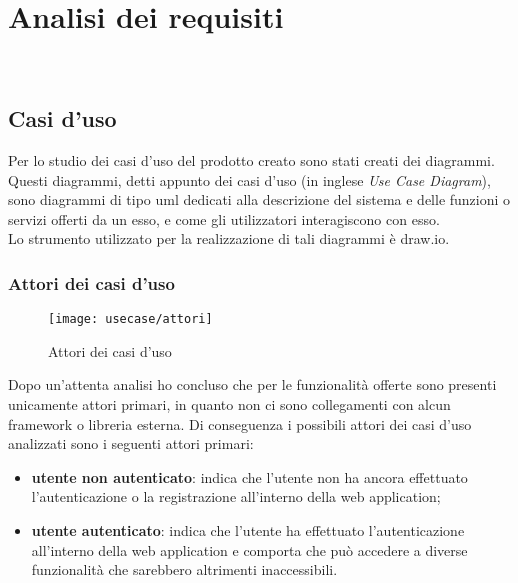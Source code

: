 
\chapter{Analisi dei requisiti}
\label{cap:analisi-requisiti}

\\

\section{Casi d'uso}
\label{sec:casi-uso}

Per lo studio dei casi d'uso del prodotto creato sono stati creati dei diagrammi.
Questi diagrammi, detti appunto dei casi d'uso (in inglese \emph{Use Case Diagram}), sono diagrammi di tipo \gls{uml} dedicati alla descrizione del sistema e delle funzioni o servizi offerti da un esso, e come gli utilizzatori interagiscono con esso.\\
Lo strumento utilizzato per la realizzazione di tali diagrammi è draw.io.

\subsection{Attori dei casi d'uso}
\label{subsec:attori}

\begin{figure}[H] 
	\centering 
	\texttt{[image: usecase/attori]} 
	\caption{Attori dei casi d'uso}
\end{figure}
Dopo un'attenta analisi ho concluso che per le funzionalità offerte sono presenti unicamente attori primari, in quanto non ci sono collegamenti con alcun framework o libreria esterna.
Di conseguenza i possibili attori dei casi d'uso analizzati sono i seguenti attori primari:
\begin{itemize}
	\item \textbf{utente non autenticato}: indica che l'utente non ha ancora effettuato l'autenticazione o la registrazione all'interno della web application;
	\item \textbf{utente autenticato}: indica che l'utente ha effettuato l'autenticazione all'interno della web application e comporta che può accedere a diverse funzionalità che sarebbero altrimenti inaccessibili.
\end{itemize}

